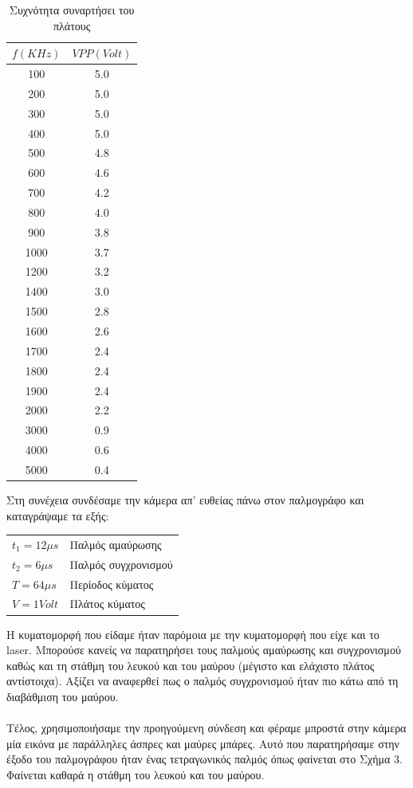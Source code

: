 \documentclass[a4paper,11pt,titlepage]{article}
\begin{document}
\begin{table}[H]
\begin{center}
    \begin{tabular}{ | c | c |}
    \hline
     $f (KHz)$ & $VPP (Volt)$\\ \hline
     100  & 5.0\\ \hline
     200  & 5.0\\ \hline
     300  & 5.0\\ \hline
     400  & 5.0\\ \hline
     500  & 4.8\\ \hline
     600  & 4.6\\ \hline
     700  & 4.2\\ \hline
     800  & 4.0\\ \hline
     900  & 3.8\\ \hline
     1000 & 3.7\\ \hline
     1200 & 3.2\\ \hline
     1400 & 3.0\\ \hline
     1500 & 2.8\\ \hline
     1600 & 2.6\\ \hline
     1700 & 2.4\\ \hline
     1800 & 2.4\\ \hline
     1900 & 2.4\\ \hline
     2000 & 2.2\\ \hline
     3000 & 0.9\\ \hline
     4000 & 0.6\\ \hline
     5000 & 0.4\\ \hline
    \end{tabular}
\end{center}
\caption{Συχνότητα συναρτήσει του πλάτους}
\end{table}

\newpage

Στη συνέχεια συνδέσαμε την κάμερα απ' ευθείας πάνω στον παλμογράφο και καταγράψαμε τα εξής:

\begin{tabular}{l | l}
\hline
$t_{1}=12{\mu}s$ & Παλμός αμαύρωσης\\
$t_{2}=6{\mu}s$  & Παλμός συγχρονισμού\\
$T=64{\mu}s$     & Περίοδος κύματος\\
$V=1Volt$        & Πλάτος κύματος\\
\hline
\end{tabular}

Η κυματομορφή που είδαμε ήταν παρόμοια με την κυματομορφή που είχε και το laser. Μπορούσε κανείς να παρατηρήσει τους παλμούς αμαύρωσης και συγχρονισμού καθώς και τη στάθμη του λευκού και του μαύρου (μέγιστο και ελάχιστο πλάτος αντίστοιχα). Αξίζει να αναφερθεί πως ο παλμός συγχρονισμού ήταν πιο κάτω από τη διαβάθμιση του μαύρου.\\\\
Τέλος, χρησιμοποιήσαμε την προηγούμενη σύνδεση και φέραμε μπροστά στην κάμερα μία εικόνα με παράλληλες άσπρες και μαύρες μπάρες. Αυτό που παρατηρήσαμε στην έξοδο του παλμογράφου ήταν ένας τετραγωνικός παλμός όπως φαίνεται στο Σχήμα 3. Φαίνεται καθαρά η στάθμη του λευκού και του μαύρου.
\end{document}

